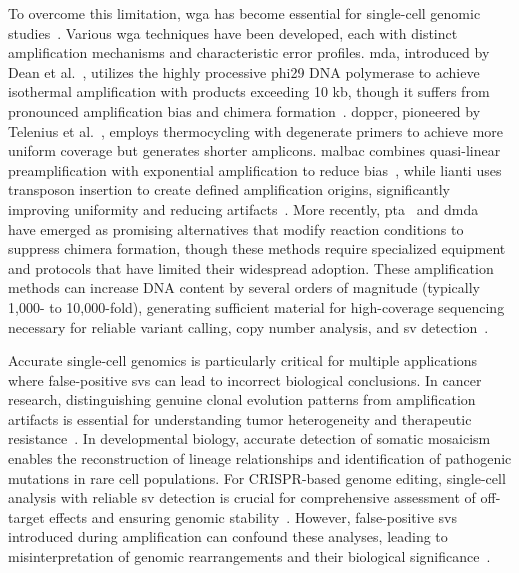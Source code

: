 \documentclass[pdflatex,sn-nature,lineno]{sn-jnl}%
\theoremstyle{thmstyleone}%
\theoremstyle{thmstyletwo}%
\theoremstyle{thmstylethree}%
\begin{document}
To overcome this limitation, \gls{wga} has become essential for single-cell genomic studies~\cite{zong2012genome,huang2015single,dean2002comprehensive, chen2017singlecell,macaulay2014single}.
Various \gls{wga} techniques have been developed, each with distinct amplification mechanisms and characteristic error profiles.
\gls{mda}, introduced by Dean et al.~\cite{dean2002comprehensive}, utilizes the highly processive phi29 DNA polymerase to achieve isothermal amplification with products exceeding 10 kb, though it suffers from pronounced amplification bias and chimera formation~\cite{lasken2007mechanism,pinard2006assessment}.
\gls{doppcr}, pioneered by Telenius et al.~\cite{telenius1992degenerate}, employs thermocycling with degenerate primers to achieve more uniform coverage but generates shorter amplicons.
\gls{malbac} combines quasi-linear preamplification with exponential amplification to reduce bias~\cite{zong2012genome}, while \gls{lianti} uses transposon insertion to create defined amplification origins, significantly improving uniformity and reducing artifacts~\cite{chen2017singlecell}.
More recently, \gls{pta}~\cite{gonzalez-pena2021accurate} and \gls{dmda}~\cite{hard2023longread, dippenaar2024droplet} have emerged as promising alternatives that modify reaction conditions to suppress chimera formation, though these methods require specialized equipment and protocols that have limited their widespread adoption.
These amplification methods can increase DNA content by several orders of magnitude (typically 1,000- to 10,000-fold), generating sufficient material for high-coverage sequencing necessary for reliable variant calling, copy number analysis, and \gls{sv} detection~\cite{macaulay2014single,de2014quantitative, biezuner2021comparison,fu2015uniform,agyabeng2025evaluating,dean2001rapid}.

Accurate single-cell genomics is particularly critical for multiple applications where false-positive \glspl{sv} can lead to incorrect biological conclusions.
In cancer research, distinguishing genuine clonal evolution patterns from amplification artifacts is essential for understanding tumor heterogeneity and therapeutic resistance~\cite{navin2011tumour}.
In developmental biology, accurate detection of somatic mosaicism enables the reconstruction of lineage relationships and identification of pathogenic mutations in rare cell populations.
For CRISPR-based genome editing, single-cell analysis with reliable \gls{sv} detection is crucial for comprehensive assessment of off-target effects and ensuring genomic stability~\cite{gonzalez-pena2021accurate}.
However, false-positive \glspl{sv} introduced during amplification can confound these analyses, leading to misinterpretation of genomic rearrangements and their biological significance~\cite{macaulay2014single,lu2023chimera}.
\end{document}
